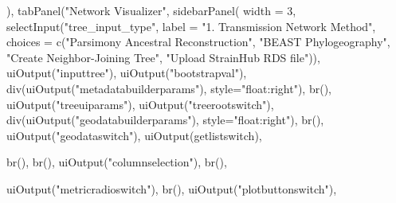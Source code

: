 \documentclass[
]{article}
\newenvironment{Shaded}{\begin{snugshade}}{\end{snugshade}}
\newcommand{\AttributeTok}[1]{\textcolor[rgb]{0.77,0.63,0.00}{#1}}
\newcommand{\DecValTok}[1]{\textcolor[rgb]{0.00,0.00,0.81}{#1}}
\newcommand{\FunctionTok}[1]{\textcolor[rgb]{0.00,0.00,0.00}{#1}}
\newcommand{\NormalTok}[1]{#1}
\newcommand{\StringTok}[1]{\textcolor[rgb]{0.31,0.60,0.02}{#1}}
\begin{document}
\begin{Shaded}
\begin{Highlighting}[]
\NormalTok{             ),}
    \FunctionTok{tabPanel}\NormalTok{(}\StringTok{"Network Visualizer"}\NormalTok{,}
             \FunctionTok{sidebarPanel}\NormalTok{(}
               \AttributeTok{width =} \DecValTok{3}\NormalTok{,}
               \FunctionTok{selectInput}\NormalTok{(}\StringTok{"tree\_input\_type"}\NormalTok{,}
                           \AttributeTok{label =} \StringTok{"1. Transmission Network Method"}\NormalTok{,}
                           \AttributeTok{choices =} \FunctionTok{c}\NormalTok{(}\StringTok{"Parsimony Ancestral Reconstruction"}\NormalTok{, }\StringTok{"BEAST Phylogeography"}\NormalTok{, }\StringTok{"Create Neighbor{-}Joining Tree"}\NormalTok{, }\StringTok{"Upload StrainHub RDS file"}\NormalTok{)),}
               \FunctionTok{uiOutput}\NormalTok{(}\StringTok{"inputtree"}\NormalTok{),}
               \FunctionTok{uiOutput}\NormalTok{(}\StringTok{"bootstrapval"}\NormalTok{),}
               \FunctionTok{div}\NormalTok{(}\FunctionTok{uiOutput}\NormalTok{(}\StringTok{"metadatabuilderparams"}\NormalTok{), }\AttributeTok{style=}\StringTok{"float:right"}\NormalTok{),}
               \FunctionTok{br}\NormalTok{(),}
               \FunctionTok{uiOutput}\NormalTok{(}\StringTok{"treeuiparams"}\NormalTok{),}
               \FunctionTok{uiOutput}\NormalTok{(}\StringTok{"treerootswitch"}\NormalTok{),}
               \FunctionTok{div}\NormalTok{(}\FunctionTok{uiOutput}\NormalTok{(}\StringTok{"geodatabuilderparams"}\NormalTok{), }\AttributeTok{style=}\StringTok{"float:right"}\NormalTok{),}
               \FunctionTok{br}\NormalTok{(),}
               \FunctionTok{uiOutput}\NormalTok{(}\StringTok{"geodataswitch"}\NormalTok{),}
               \FunctionTok{uiOutput}\NormalTok{(}\StringTok{\textquotesingle{}getlistswitch\textquotesingle{}}\NormalTok{),}

               \FunctionTok{br}\NormalTok{(),}
               \FunctionTok{br}\NormalTok{(),}
               \FunctionTok{uiOutput}\NormalTok{(}\StringTok{"columnselection"}\NormalTok{),}
               \FunctionTok{br}\NormalTok{(),}
               
               \FunctionTok{uiOutput}\NormalTok{(}\StringTok{"metricradioswitch"}\NormalTok{),}
               \FunctionTok{br}\NormalTok{(),}
               \FunctionTok{uiOutput}\NormalTok{(}\StringTok{"plotbuttonswitch"}\NormalTok{),}


\end{Highlighting}
\end{Shaded}
\end{document}
